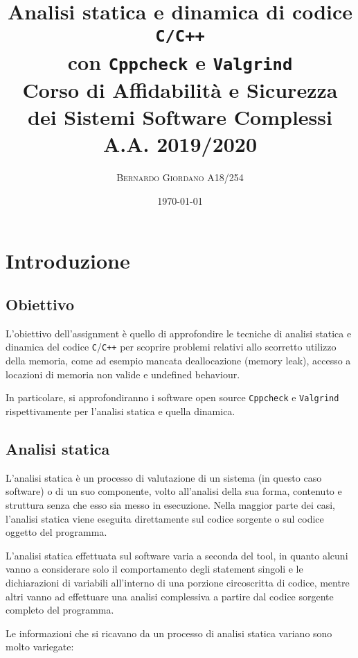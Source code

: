 \documentclass{article}
\title{
    Analisi statica e dinamica di codice \texttt{C/C++} \\ con
    \texttt{Cppcheck} e \texttt{Valgrind} \\ \vspace{16px}
    \small Corso di Affidabilità e Sicurezza \\ dei Sistemi Software Complessi A.A. 2019/2020
}
\author{\textsc{Bernardo Giordano A18/254}}
\date{\today}
\begin{document}
\maketitle


\section{Introduzione}

\subsection{Obiettivo}
\label{sec:obiettivo}

L'obiettivo dell'assignment è quello di approfondire le tecniche di analisi
statica e dinamica del codice \texttt{C}/\texttt{C++} per scoprire problemi relativi allo
scorretto utilizzo della memoria, come ad esempio mancata deallocazione (memory
leak), accesso a locazioni di memoria non valide e undefined behaviour.

In particolare, si approfondiranno i software open source \texttt{Cppcheck} e
\texttt{Valgrind} rispettivamente per l'analisi statica e quella dinamica.

\subsection{Analisi statica}
\label{sec:analisistatica}

L'analisi statica è un processo di valutazione di un sistema (in questo caso
software) o di un suo componente, volto all'analisi della sua forma, contenuto e
struttura senza che esso sia messo in esecuzione. Nella maggior parte dei casi,
l'analisi statica viene eseguita direttamente sul codice sorgente o sul codice
oggetto del programma.

L'analisi statica effettuata sul software varia a seconda del tool, in quanto
alcuni vanno a considerare solo il comportamento degli statement singoli e le
dichiarazioni di variabili all'interno di una porzione circoscritta di codice,
mentre altri vanno ad effettuare una analisi complessiva a partire dal codice
sorgente completo del programma. 

Le informazioni che si ricavano da un processo di analisi statica variano sono
molto variegate:
\end{document}
